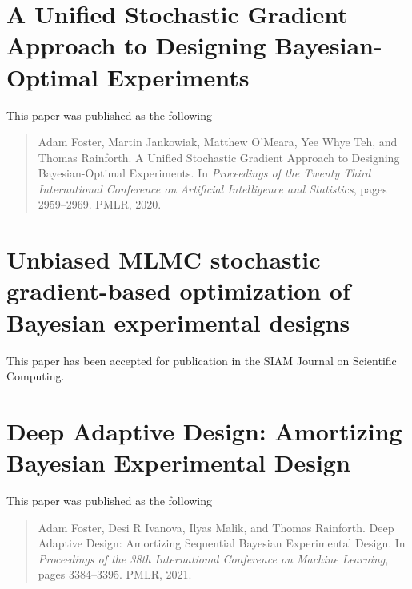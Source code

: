 \documentclass[a4paper, 10pt]{report}
\theoremstyle{plain}
\theoremstyle{definition}
\theoremstyle{remark}
\begin{document}
	
	
	
	
	\chapter{A Unified Stochastic Gradient Approach to Designing Bayesian-Optimal Experiments}
	\label{chap:sgboed}
	This paper was published as the following
	\begin{quote}
		Adam Foster, Martin Jankowiak, Matthew O'Meara, Yee Whye Teh, and Thomas Rainforth. A Unified Stochastic Gradient Approach to Designing Bayesian-Optimal Experiments.  In \emph{Proceedings of the Twenty Third International Conference on Artificial Intelligence and Statistics}, pages 2959--2969. PMLR, 2020.
	\end{quote}
	
	
	
	\chapter{Unbiased MLMC stochastic gradient-based optimization of Bayesian experimental designs}
	\label{chap:mlmc}
	This paper has been accepted for publication in the SIAM Journal on Scientific Computing.
	
	
	
	\chapter{Deep Adaptive Design: Amortizing Bayesian Experimental Design}
	\label{chap:dad}
	This paper was published as the following
	\begin{quote}
		Adam Foster, Desi R Ivanova, Ilyas Malik, and Thomas Rainforth. Deep Adaptive Design: Amortizing Sequential Bayesian Experimental Design. In \emph{Proceedings of the 38th International Conference on Machine Learning}, pages 3384--3395. PMLR, 2021.
	\end{quote}
	
	
	
\end{document}
